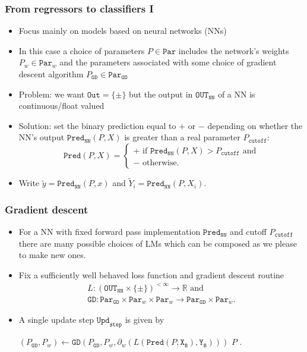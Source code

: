 \documentclass{beamer}
\newcommand{\OUT}{{\texttt{Out}}}
\newcommand{\OUTSMOOTH}{{\texttt{OUT}_{\texttt{NN}}}}
\newcommand{\TWO}{\{\pm\}}
\newcommand{\PAR}{{\texttt{Par}}}
\newcommand{\GD}{{\texttt{GD}}}
\newcommand{\CO}{{P_{\texttt{cutoff}}}}
\newcommand{\PRED}{{\texttt{Pred}}}
\newcommand{\PREDSMOOTH}{{\texttt{Pred}_{\texttt{NN}}}}
\newcommand{\yN}{{\tilde y}}
\newcommand{\YN}{{\tilde Y}}
\newcommand{\UPDSTEP}{{\texttt{Upd}_{\texttt{step}}}}
\newcommand{\XB}{{\texttt{X}_{\texttt{B}}}}
\newcommand{\YB}{{\texttt{Y}_{\texttt{B}}}}
\begin{document}
\begin{frame}
\frametitle{From regressors to classifiers I}
\begin{itemize}
\item
Focus mainly on models based on neural networks (NNs)
\item
In this case a choice of parameters $P\in\PAR$ includes the network's weights $P_w\in\PAR_w$ and the parameters associated with some choice of gradient descent algorithm $P_\GD\in\PAR_\GD$
\item
  Problem: we want $\OUT=\TWO$ but the output in $\OUTSMOOTH$ of a NN is continuous/float valued
\item
  Solution: set the binary prediction equal to $+$ or $-$ depending on whether the NN's output $\PREDSMOOTH(P,X)$ is greater than a real parameter $\CO$: 
$$
\PRED(P,X)=\begin{cases}+\text{ if }\PREDSMOOTH(P,X)>\CO\text{ and}\\-\text{ otherwise.}\end{cases}
$$
\item
  Write $\yN=\PREDSMOOTH(P,x)$ and $\YN_i=\PREDSMOOTH(P,X_i)$.
\end{itemize}
\end{frame}
\begin{frame}
\frametitle{Gradient descent}
\begin{itemize}
\item
  For a NN with fixed forward pass implementation $\PREDSMOOTH$ and cutoff $\CO$ there are many possible choices of LMs which can be composed as we please to make new ones.
\item
  Fix a sufficiently well behaved loss function and gradient descent routine
    \begin{gather*}
      L:(\OUTSMOOTH\times\TWO)^{<\infty}\rightarrow\mathbb R\text{ and}\\
      \GD:\PAR_\GD\times\PAR_w\times\PAR_w\rightarrow\PAR_\GD\times\PAR_w.
    \end{gather*}
\item
A single update step $\UPDSTEP$ is given by
\begin{algorithmic}[0]
\Function{$\UPDSTEP$}{$P,\XB,\YB$}
  \State $(P_\GD,P_w)\gets\GD(P_\GD,P_w,\partial_w(L(\PRED(P,\XB),\YB)))$
  \State\Return $P$
\EndFunction.
\end{algorithmic}
\end{itemize}
\end{frame}
\end{document}
